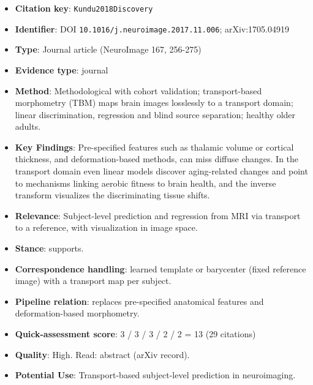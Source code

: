 \documentclass[journal,onecolumn]{IEEEtran}
\begin{document}
\begin{itemize}

\item{} \textbf{Citation key}: \texttt{Kundu2018Discovery}

\item{} \textbf{Identifier}: DOI \nolinkurl{10.1016/j.neuroimage.2017.11.006}; arXiv:1705.04919

\item{} \textbf{Type}: Journal article (NeuroImage 167, 256-275)

\item{} \textbf{Evidence type}: journal

\item{} \textbf{Method}: Methodological with cohort validation; transport-based morphometry (TBM) maps brain images losslessly to a transport domain; linear discrimination, regression and blind source separation; healthy older adults.

\item{} \textbf{Key Findings}: Pre-specified features such as thalamic volume or cortical thickness, and deformation-based methods, can miss diffuse changes. In the transport domain even linear models discover aging-related changes and point to mechanisms linking aerobic fitness to brain health, and the inverse transform visualizes the discriminating tissue shifts.

\item{} \textbf{Relevance}: Subject-level prediction and regression from MRI via transport to a reference, with visualization in image space.

\item{} \textbf{Stance}: supports.

\item{} \textbf{Correspondence handling}: learned template or barycenter (fixed reference image) with a transport map per subject.

\item{} \textbf{Pipeline relation}: replaces pre-specified anatomical features and deformation-based morphometry.

\item{} \textbf{Quick-assessment score}: 3 / 3 / 3 / 2 / 2 = 13 (29 citations)

\item{} \textbf{Quality}: High. Read: abstract (arXiv record).

\item{} \textbf{Potential Use}: Transport-based subject-level prediction in neuroimaging.

\end{itemize}
\end{document}
